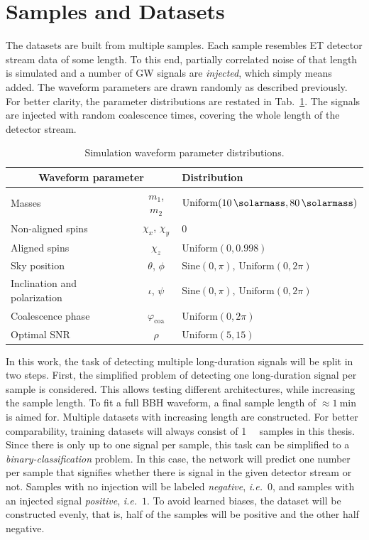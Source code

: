 \section{Samples and Datasets}

The datasets are built from multiple samples. Each sample resembles ET detector stream data of some length. To this end, partially correlated noise of that length is simulated and a number of GW signals are \emph{injected}, which simply means added. The waveform parameters are drawn randomly as described previously. For better clarity, the parameter distributions are restated in Tab.~\ref{tab:data_simulation:waveform_parameters}. The signals are injected with random coalescence times, covering the whole length of the detector stream. 

\begin{table}[]
	\centering
	\caption{Simulation waveform parameter distributions.}
	\label{tab:data_simulation:waveform_parameters}
	\begin{tabular}{l c l}
		\toprule
		\multicolumn{2}{c}{Waveform parameter} & Distribution \\
		\midrule
		Masses & $m_1$, $m_2$ 
		& $\text{Uniform}(\SI{10}{\solarmass}, \SI{80}{\solarmass})$ \\
		Non-aligned spins & $\chi_x$, $\chi_y$
		& $0$ \\
		Aligned spins & $\chi_z$
		& $\text{Uniform}(0, 0.998)$ \\
		Sky position & $\theta$, $\phi$
		& $\text{Sine}(0, \pi)$, $\text{Uniform}(0, 2\pi)$ \\
		Inclination and polarization & $\iota$, $\psi$
		& $\text{Sine}(0, \pi)$, $\text{Uniform}(0, 2\pi)$ \\
		Coalescence phase & $\varphi_\text{coa}$
		& $\text{Uniform}(0, 2\pi)$ \\
		Optimal SNR & $\rho$
		& $\text{Uniform}(5, 15)$ \\
		
		\bottomrule
	\end{tabular}
\end{table}
In this work, the task of detecting multiple long-duration signals will be split in two steps. First, the simplified problem of detecting one long-duration signal per sample is considered. This allows testing different architectures, while increasing the sample length. To fit a full BBH waveform, a final sample length of $\approx\SI{1}{\minute}$ is aimed for. Multiple datasets with increasing length are constructed. For better comparability, training datasets will always consist of \SI{1}{\mega\nothing} samples in this thesis. Since there is only up to one signal per sample, this task can be simplified to a \emph{binary-classification} problem. In this case, the network will predict one number per sample that signifies whether there is signal in the given detector stream or not. Samples with no injection will be labeled \emph{negative}, \emph{i.e.}\ $0$, and samples with an injected signal \emph{positive}, \emph{i.e.}\ $1$. To avoid learned biases, the dataset will be constructed evenly, that is, half of the samples will be positive and the other half negative.


